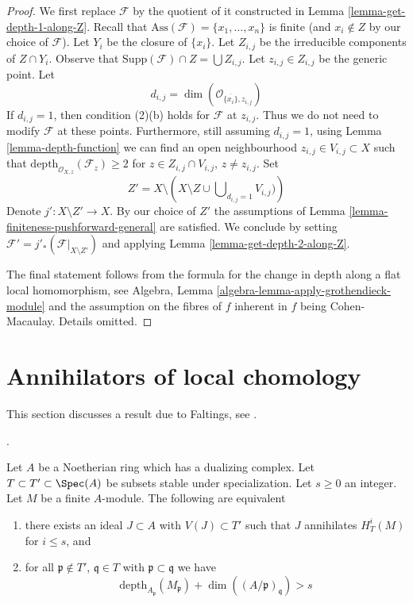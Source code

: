 \begin{proof}
We first replace $\mathcal{F}$ by the quotient of it constructed in
Lemma \ref{lemma-get-depth-1-along-Z}. Recall that
$\text{Ass}(\mathcal{F}) = \{x_1, \ldots, x_n\}$
is finite (and $x_i \not \in Z$ by our choice of $\mathcal{F}$).
Let $Y_i$ be the closure of $\{x_i\}$. Let
$Z_{i, j}$ be the irreducible components of $Z \cap Y_i$.
Observe that $\text{Supp}(\mathcal{F}) \cap Z = \bigcup Z_{i, j}$.
Let $z_{i, j} \in Z_{i, j}$ be the generic point.
Let
$$
d_{i, j} = \dim(\mathcal{O}_{\overline{\{x_i\}}, z_{i, j}})
$$
If $d_{i, j} = 1$, then condition (2)(b) holds for
$\mathcal{F}$ at $z_{i, j}$. Thus we do not need to modify
$\mathcal{F}$ at these points. Furthermore, still assuming
$d_{i, j} = 1$, using Lemma \ref{lemma-depth-function}
we can find an open neighbourhood
$z_{i, j} \in V_{i, j} \subset X$ such that
$\text{depth}_{\mathcal{O}_{X, z}}(\mathcal{F}_z) \geq 2$
for $z \in Z_{i, j} \cap V_{i, j}$, $z \not = z_{i, j}$.
Set
$$
Z' = X \setminus
\left(
X \setminus Z \cup \bigcup\nolimits_{d_{i, j} = 1} V_{i, j})
\right)
$$
Denote $j' : X \setminus Z' \to X$. By our choice of $Z'$
the assumptions of Lemma \ref{lemma-finiteness-pushforward-general}
are satisfied.
We conclude by setting $\mathcal{F}' = j'_*(\mathcal{F}|_{X \setminus Z'})$
and applying Lemma \ref{lemma-get-depth-2-along-Z}.

\medskip\noindent
The final statement follows from the formula for the change in
depth along a flat local homomorphism, see
Algebra, Lemma \ref{algebra-lemma-apply-grothendieck-module}
and the assumption on the fibres of $f$ inherent in $f$ being
Cohen-Macaulay. Details omitted.
\end{proof}







\section{Annihilators of local chomology}
\label{section-annihilators}

\noindent
This section discusses a result due to Faltings, see
\cite{Faltings-annulators}.

\begin{proposition}
\label{proposition-annihilator}
\begin{reference}
\cite{Faltings-annulators}.
\end{reference}
Let $A$ be a Noetherian ring which has a dualizing complex.
Let $T \subset T' \subset \Spec(A)$ be subsets stable under
specialization. Let $s \geq 0$ an integer. Let $M$ be a finite $A$-module.
The following are equivalent
\begin{enumerate}
\item there exists an ideal $J \subset A$ with $V(J) \subset T'$
such that $J$ annihilates $H^i_T(M)$ for $i \leq s$, and
\item for all $\mathfrak p \not \in T'$,
$\mathfrak q \in T$ with $\mathfrak p \subset \mathfrak q$
we have
$$
\text{depth}_{A_\mathfrak p}(M_\mathfrak p) +
\dim((A/\mathfrak p)_\mathfrak q) > s
$$
\end{enumerate}
\end{proposition}


